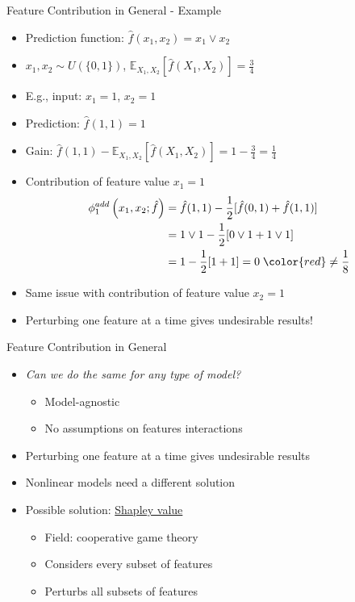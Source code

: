 \documentclass[dvipsnames]{beamer}
\newcommand{\red}[1]{{\color{red} #1}}
\begin{document}


\begin{frame}{Feature Contribution in General - Example}
	\begin{itemize}
		\item<1-> Prediction function: $\hat{f}(x_1, x_2) = x_1 \lor x_2$
		\item<1-> $x_1, x_2 \sim U(\{0, 1\})$, $\mathbb{E}_{X_1,X_2}\left[\hat{f}(X_1,X_2)\right] = \frac{3}{4}$
		\item<1-> E.g., input: $x_1 = 1$, $x_2 = 1$
		\item<1-> Prediction: $\hat{f}(1, 1) = 1$
		\item<1-> Gain: $\hat{f}(1, 1) - \mathbb{E}_{X_1,X_2}\left[\hat{f}(X_1,X_2)\right] = 1 - \frac{3}{4} = \frac{1}{4}$
		\item<1-> Contribution of feature value $x_1 = 1$
		\begin{align}\begin{split}
			\phi^{add}_1\left(x_1, x_2;\hat{f}\right) 
			&=\hat{f}(1, 1)-\frac{1}{2} [\hat{f}(0, 1) + \hat{f}(1, 1)]\\
			&=1 \lor 1-\frac{1}{2} [0 \lor 1 + 1 \lor 1]\\
			&=1 -\frac{1}{2} [1 + 1] = 0 \; \red{\neq \frac{1}{8}}
		\end{split}\end{align}
		\item<1-> Same issue with contribution of feature value $x_2 = 1$
		\vspace{1em}
		\item<2-> \red{Perturbing one feature at a time gives undesirable results!}
	\end{itemize}
\end{frame}

\begin{frame}{Feature Contribution in General}
	\begin{itemize}
		\item<1-> \emph{Can we do the same for any type of model?}
		\begin{itemize}
			\item Model-agnostic
			\item No assumptions on features interactions
		\end{itemize}
		\vspace{2em}
		\item<2-> Perturbing one feature at a time gives undesirable results
		\item<2-> Nonlinear models need a different solution
		\vspace{2em}
		\item<3-> Possible solution: \underline{Shapley value}
		\begin{itemize}
			\item Field: cooperative game theory
			\item Considers every subset of features
			\item Perturbs all subsets of features
		\end{itemize}
	\end{itemize}
\end{frame}
\end{document}
